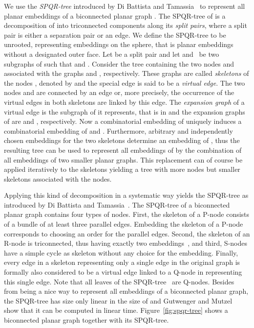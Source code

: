 \documentclass{scrartcl}
\renewcommand{\todo}[1]{}
\newcommand{\1}[1]{{\normalfont \ensuremath{#1^{\tiny\circled{1}}}}} \newcommand{\2}[1]{{\normalfont \ensuremath{#1^{\tiny\circled{2}}}}} \renewcommand{\k}[1]{{\normalfont \ensuremath{#1^{\tiny\circled{k}}}}} \newcommand{\proj}[2]{\ensuremath{\left.#1\right|_{#2}}} \newcommand{\eps}{\varepsilon}
\theoremstyle{plain} \newtheorem{theorem}{Theorem} \newcounter{lemmacounter} \setcounter{lemmacounter}{0} \newtheorem{lemma}[lemmacounter]{Lemma} \newtheorem{fact}{Fact}  \newtheorem{corollary}{Corollary} \theoremstyle{definition} \newtheorem{definition}{Definition}
\begin{document}
We use the \emph{SPQR-tree} introduced by Di Battista and
Tamassia~\cite{dt-omtc-96,dt-opt-96} to represent all planar
embeddings of a biconnected planar graph .  The SPQR-tree  of  is a decomposition of  into triconnected components along
its \emph{split pairs}, where a split pair is either a separation pair
or an edge.  We define the SPQR-tree to be unrooted, representing
embeddings on the sphere, that is planar embeddings without a
designated outer face.  Let  be a split pair and let 
and~ be two subgraphs of  such that  and
.  Consider the tree containing the two nodes
 and  associated with the graphs  and
, respectively.  These graphs are called
\emph{skeletons} of the nodes , denoted by  and
the special edge  is said to be a \emph{virtual edge}.  The
two nodes  and  are connected by an edge or, more
precisely, the occurrence of the virtual edges  in both
skeletons are linked by this edge.  The \emph{expansion graph}
 of a virtual edge  is the subgraph of 
it represents, that is in  and  the
expansion graphs of  are  and , respectively.  Now
a combinatorial embedding of  uniquely induces a combinatorial
embedding of  and .  Furthermore,
arbitrary and independently chosen embeddings for the two skeletons
determine an embedding of , thus the resulting tree can be used to
represent all embeddings of  by the combination of all embeddings
of two smaller planar graphs.  This replacement can of course be
applied iteratively to the skeletons yielding a tree with more nodes
but smaller skeletons associated with the nodes.

Applying this kind of decomposition in a systematic way yields the
SPQR-tree as introduced by Di Battista and
Tamassia~\cite{dt-omtc-96,dt-opt-96}.  The SPQR-tree  of a
biconnected planar graph  contains four types of nodes.  \todo{Pag
  7, line 1-2:}First, the skeleton of a P-node consists of a bundle of
at least three parallel edges.  Embedding the skeleton of a P-node
corresponds to choosing an order for the parallel edges.  Second, the
skeleton of an R-node is triconnected, thus having exactly two
embeddings~\cite{w-cgcg-32}, and third, S-nodes have a simple cycle as
skeleton without any choice for the embedding.  Finally, every edge in
a skeleton representing only a single edge in the original graph 
is formally also considered to be a virtual edge linked to a Q-node in
 representing this single edge.  Note that all leaves of
the SPQR-tree~ are Q-nodes.  Besides from being a nice way
to represent all embeddings of a biconnected planar graph, the
SPQR-tree has size only linear in the size of  and Gutwenger and
Mutzel~\cite{gm-lti-00} show that it can be computed in linear time.
Figure~\ref{fig:spqr-tree} shows a biconnected planar graph together
with its SPQR-tree.
\end{document}
